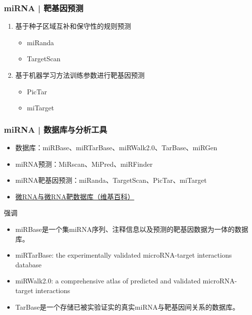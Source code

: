 \begin{frame}
  \frametitle{miRNA | \alert{靶基因预测}}
  \begin{enumerate}
    \item 基于种子区域互补和保守性的规则预测
      \begin{itemize}
        \item miRanda
        \item TargetScan
      \end{itemize}
    \item 基于机器学习方法训练参数进行靶基因预测
      \begin{itemize}
        \item PicTar
        \item miTarget
      \end{itemize}
  \end{enumerate}
\end{frame}

\begin{frame}
  \frametitle{miRNA | 数据库与分析工具}
  \begin{itemize}
    \item 数据库：miRBase、miRTarBase、miRWalk2.0、TarBase、miRGen
    \item miRNA预测：MiRscan、MiPred、miRFinder
    \item miRNA靶基因预测：miRanda、TargetScan、PicTar、miTarget
    \item \href{http://zh.wikipedia.org/wiki/\%E5\%BE\%AERNA\%E4\%B8\%8E\%E5\%BE\%AERNA\%E9\%9D\%B6\%E6\%95\%B0\%E6\%8D\%AE\%E5\%BA\%93}{微RNA与微RNA靶数据库（维基百科）}
  \end{itemize}
  \pause
  \begin{block}{强调}
    \begin{itemize}
      \item miRBase是一个集miRNA序列、注释信息以及预测的靶基因数据为一体的数据库。
      \item miRTarBase: the experimentally validated microRNA-target interactions database
      \item miRWalk2.0: a comprehensive atlas of predicted and validated microRNA-target interactions
      \item TarBase是一个存储已被实验证实的真实miRNA与靶基因间关系的数据库。
    \end{itemize}
  \end{block}
\end{frame}

